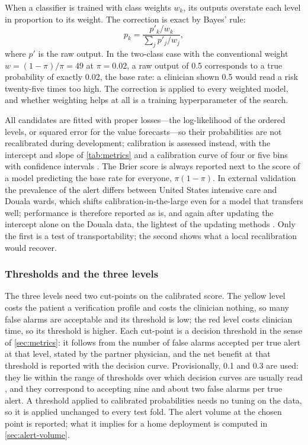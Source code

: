 When a classifier is trained with class weights $w_k$, its outputs overstate each level in proportion to its weight. The correction is exact by Bayes' rule:
\begin{equation}
  p_k = \frac{p'_k / w_k}{\sum_j p'_j / w_j},
\end{equation}
where $p'$ is the raw output. In the two-class case with the conventional weight $w = (1-\pi)/\pi = 49$ at $\pi = 0.02$, a raw output of 0.5 corresponds to a true probability of exactly 0.02, the base rate: a clinician shown 0.5 would read a risk twenty-five times too high. The correction is applied to every weighted model, and whether weighting helps at all is a training hyperparameter of the search.

All candidates are fitted with proper losses---the log-likelihood of the ordered levels, or squared error for the value forecasts---so their probabilities are not recalibrated during development; calibration is assessed instead, with the intercept and slope of \cref{tab:metrics} and a calibration curve of four or five bins with confidence intervals \parencite{vancalster2019}. The Brier score is always reported next to the score of a model predicting the base rate for everyone, $\pi(1-\pi)$. In external validation the prevalence of the alert differs between United States intensive care and Douala wards, which shifts calibration-in-the-large even for a model that transfers well; performance is therefore reported as is, and again after updating the intercept alone on the Douala data, the lightest of the updating methods \parencite{janssen2008}. Only the first is a test of transportability; the second shows what a local recalibration would recover.

\subsubsection{Thresholds and the three levels}\label{sec:tiers}\label{sec:threshold-selection}\label{sec:rule-floor}

The three levels need two cut-points on the calibrated score. The yellow level costs the patient a verification profile and costs the clinician nothing, so many false alarms are acceptable and its threshold is low; the red level costs clinician time, so its threshold is higher. Each cut-point is a decision threshold in the sense of \cref{sec:metrics}: it follows from the number of false alarms accepted per true alert at that level, stated by the partner physician, and the net benefit at that threshold is reported with the decision curve. Provisionally, 0.1 and 0.3 are used: they lie within the range of thresholds over which decision curves are usually read \parencite{vickers2006}, and they correspond to accepting nine and about two false alarms per true alert. A threshold applied to calibrated probabilities needs no tuning on the data, so it is applied unchanged to every test fold. The alert volume at the chosen point is reported; what it implies for a home deployment is computed in \cref{sec:alert-volume}.


